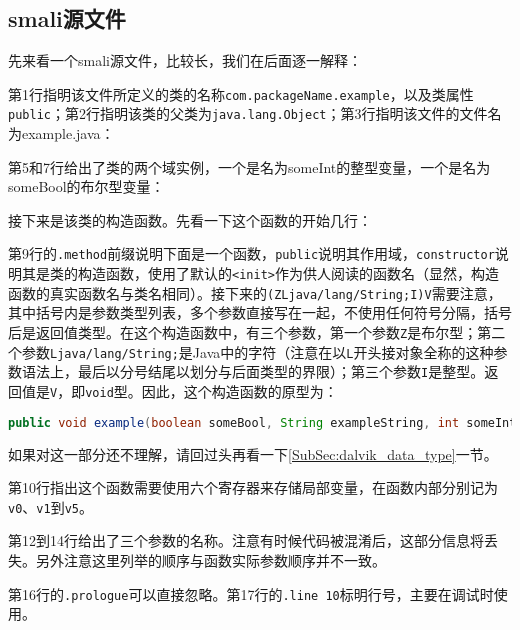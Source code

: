 \subsection{smali源文件}
先来看一个smali源文件，比较长，我们在后面逐一解释：


第1行指明该文件所定义的类的名称\lstinline!com.packageName.example!，以及类属性\lstinline!public!；第2行指明该类的父类为\lstinline!java.lang.Object!；第3行指明该文件的文件名为example.java：


第5和7行给出了类的两个域实例，一个是名为someInt的整型变量，一个是名为someBool的布尔型变量：


接下来是该类的构造函数。先看一下这个函数的开始几行：

第9行的\lstinline!.method!前缀说明下面是一个函数，\lstinline!public!说明其作用域，\lstinline!constructor!说明其是类的构造函数，使用了默认的\lstinline!<init>!作为供人阅读的函数名（显然，构造函数的真实函数名与类名相同）。接下来的\lstinline!(ZLjava/lang/String;I)V!需要注意，其中括号内是参数类型列表，多个参数直接写在一起，不使用任何符号分隔，括号后是返回值类型。在这个构造函数中，有三个参数，第一个参数\lstinline!Z!是布尔型；第二个参数\lstinline!Ljava/lang/String;!是Java中的字符（注意在以\lstinline!L!开头接对象全称的这种参数语法上，最后以分号结尾以划分与后面类型的界限）；第三个参数\lstinline!I!是整型。返回值是\lstinline!V!，即\lstinline!void!型。因此，这个构造函数的原型为：
\begin{lstlisting}[language=java, numbers=none]
public void example(boolean someBool, String exampleString, int someInt);
\end{lstlisting}
如果对这一部分还不理解，请回过头再看一下\ref{SubSec:dalvik_data_type}一节。

第10行指出这个函数需要使用六个寄存器来存储局部变量，在函数内部分别记为\lstinline!v0!、\lstinline!v1!到\lstinline!v5!。

第12到14行给出了三个参数的名称。注意有时候代码被混淆后，这部分信息将丢失。另外注意这里列举的顺序与函数实际参数顺序并不一致。


第16行的\lstinline!.prologue!可以直接忽略。第17行的\lstinline!.line 10!标明行号，主要在调试时使用。

